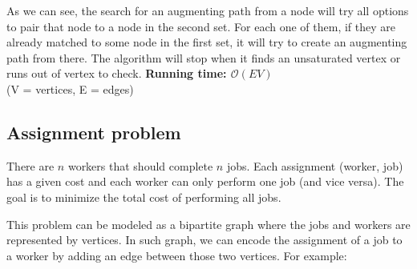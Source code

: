 As we can see, the search for an augmenting path from a node will try
all options to pair that node to a node in the second set. For each one
of them, if they are already matched to some node in the first set, 
it will try to create an augmenting path from there. The algorithm will
stop when it finds an unsaturated vertex or runs out of vertex to check.
\newpage
{}
\noindent \textbf{\boldmath Running time: $\mathcal{O}(EV)$}
\\ {\small(V = vertices, E = edges)}

\newpage
\subsection{Assignment problem}
There are $n$ workers that should complete $n$ jobs. Each 
assignment (worker, job) has a given cost and each worker can only
perform one job (and vice versa). The goal is to minimize the total
cost of performing all jobs.

This problem can be modeled as a bipartite graph where the jobs and
workers are represented by vertices. In such graph, we can encode the
assignment of a job to a worker by adding an edge between those two 
vertices. For example:

